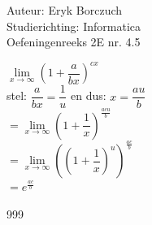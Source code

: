 \documentclass[a4paper]{article}
\begin{document}
  
\noindent \large Auteur: Eryk Borczuch \\
\noindent \large Studierichting: Informatica\\
\noindent \large Oefeningenreeks 2E nr. 4.5\\

\medskip

\normalsize

$\lim\limits_{x \rightarrow \infty} \left(1+\dfrac{a}{bx}\right)^{cx} $\\

stel: $\dfrac{a}{bx} = \dfrac{1}{u}$    en dus: $x = \dfrac{au}{b}$\\

 $= \lim\limits_{x \rightarrow \infty} \left(1+\dfrac{1}{x}\right)^{\tfrac{acu}{b}} $\\

 
 $= \lim\limits_{x \rightarrow \infty} \left(\left(1+\dfrac{1}{x}\right)^{u}\right)^{\tfrac{ac}{b}} $\\


$=e^{\tfrac{ac}{b}}$
\begin{thebibliography}{999}
\end{thebibliography}
\end{document}

